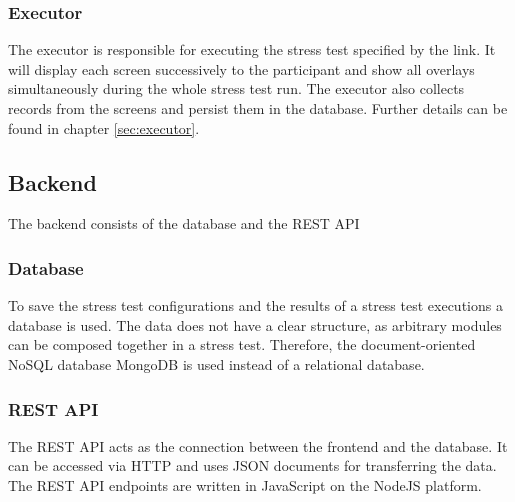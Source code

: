 \subsubsection*{Executor}
The executor is responsible for executing the stress test specified by the link.
It will display each screen successively to the participant and show all overlays simultaneously during the whole stress test run.
The executor also collects records from the screens and persist them in the database.
Further details can be found in chapter \ref{sec:executor}.

\subsection{Backend}
The backend consists of the database and the REST API

\subsubsection*{Database}
To save the stress test configurations and the results of a stress test executions a database is used.
The data does not have a clear structure, as arbitrary modules can be composed together in a stress test.
Therefore, the document-oriented NoSQL database MongoDB is used instead of a relational database.

\subsubsection*{REST API}
The REST API acts as the connection between the frontend and the database.
It can be accessed via HTTP and uses JSON documents for transferring the data.
The REST API endpoints are written in JavaScript on the NodeJS platform.
